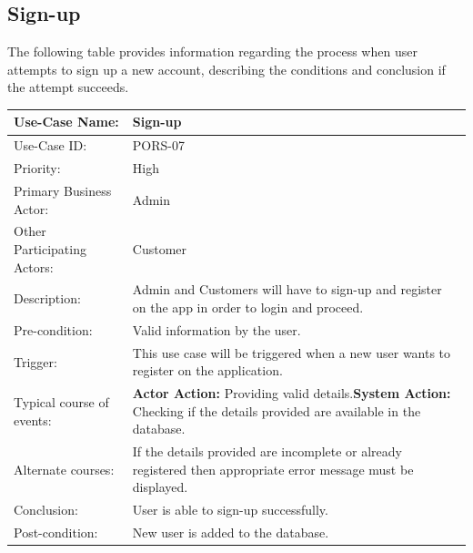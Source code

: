 \subsection{Sign-up}
The following table provides information regarding the process when user attempts to sign up a new account, describing the conditions and conclusion if the attempt succeeds. 
\begin{center}
    \begin{tabular}{ @{}|p{5cm}||p{7cm}|  }
    \hline
    Use-Case Name: & Sign-up  \\ \hline
    Use-Case ID: & PORS-07 \\ \hline
    Priority: & High \\ \hline
    Primary Business Actor: & Admin \\ \hline
    Other Participating Actors: & Customer \\ \hline
    Description: & Admin and Customers will have to sign-up and register on the app in order to login and proceed. \\ \hline
    Pre-condition: & Valid information by the user. \\ \hline
    Trigger: & This use case will be triggered when a new user wants to register on the application. \\ \hline
    Typical course of events: & \textbf{Actor Action:} \newline Providing valid details.\newline \textbf{System Action:} \newline Checking if the details provided are available in the database.
 \\ \hline
    Alternate courses: & If the details provided are incomplete or already registered then appropriate error message must be displayed. \\ \hline
    Conclusion: &  User is able to sign-up successfully.\\ \hline
    Post-condition: & New user is added to the database. \\ \hline
    \end{tabular}
\end{center}

